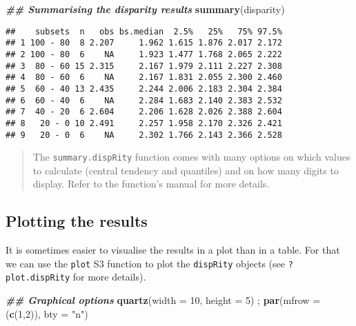 \documentclass[
]{book}
\newenvironment{Shaded}{\begin{snugshade}}{\end{snugshade}}
\newcommand{\AttributeTok}[1]{\textcolor[rgb]{0.13,0.29,0.53}{#1}}
\newcommand{\DecValTok}[1]{\textcolor[rgb]{0.00,0.00,0.81}{#1}}
\newcommand{\DocumentationTok}[1]{\textcolor[rgb]{0.56,0.35,0.01}{\textbf{\textit{#1}}}}
\newcommand{\FunctionTok}[1]{\textcolor[rgb]{0.13,0.29,0.53}{\textbf{#1}}}
\newcommand{\NormalTok}[1]{#1}
\newcommand{\StringTok}[1]{\textcolor[rgb]{0.31,0.60,0.02}{#1}}
\begin{document}
\begin{Shaded}
\begin{Highlighting}[]
\DocumentationTok{\#\# Summarising the disparity results}
\FunctionTok{summary}\NormalTok{(disparity)}
\end{Highlighting}
\end{Shaded}

\begin{verbatim}
##    subsets  n   obs bs.median  2.5%   25%   75% 97.5%
## 1 100 - 80  8 2.207     1.962 1.615 1.876 2.017 2.172
## 2 100 - 80  6    NA     1.923 1.477 1.768 2.065 2.222
## 3  80 - 60 15 2.315     2.167 1.979 2.111 2.227 2.308
## 4  80 - 60  6    NA     2.167 1.831 2.055 2.300 2.460
## 5  60 - 40 13 2.435     2.244 2.006 2.183 2.304 2.384
## 6  60 - 40  6    NA     2.284 1.683 2.140 2.383 2.532
## 7  40 - 20  6 2.604     2.206 1.628 2.026 2.388 2.604
## 8   20 - 0 10 2.491     2.257 1.958 2.170 2.326 2.421
## 9   20 - 0  6    NA     2.302 1.766 2.143 2.366 2.528
\end{verbatim}

\begin{quote}
The \texttt{summary.dispRity} function comes with many options on which values to calculate (central tendency and quantiles) and on how many digits to display. Refer to the function's manual for more details.
\end{quote}

\hypertarget{plotting-the-results}{%
\subsection{Plotting the results}\label{plotting-the-results}}

It is sometimes easier to visualise the results in a plot than in a table.
For that we can use the \texttt{plot} S3 function to plot the \texttt{dispRity} objects (see \texttt{?plot.dispRity} for more details).

\begin{Shaded}
\begin{Highlighting}[]
\DocumentationTok{\#\# Graphical options}
\FunctionTok{quartz}\NormalTok{(}\AttributeTok{width =} \DecValTok{10}\NormalTok{, }\AttributeTok{height =} \DecValTok{5}\NormalTok{) ; }\FunctionTok{par}\NormalTok{(}\AttributeTok{mfrow =}\NormalTok{ (}\FunctionTok{c}\NormalTok{(}\DecValTok{1}\NormalTok{,}\DecValTok{2}\NormalTok{)), }\AttributeTok{bty =} \StringTok{"n"}\NormalTok{)}
\end{Highlighting}
\end{Shaded}
\end{document}
